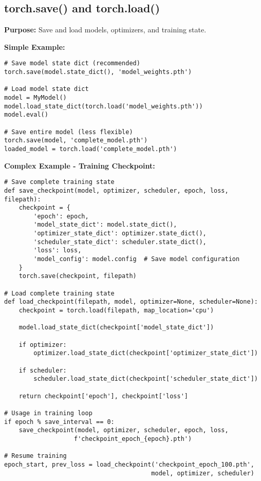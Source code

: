 \documentclass[11pt,a4paper]{book}
\begin{document}
\subsection{torch.save() and torch.load()}

\textbf{Purpose:} Save and load models, optimizers, and training state.

\textbf{Simple Example:}
\begin{verbatim}
# Save model state dict (recommended)
torch.save(model.state_dict(), 'model_weights.pth')

# Load model state dict
model = MyModel()
model.load_state_dict(torch.load('model_weights.pth'))
model.eval()

# Save entire model (less flexible)
torch.save(model, 'complete_model.pth')
loaded_model = torch.load('complete_model.pth')
\end{verbatim}

\textbf{Complex Example - Training Checkpoint:}
\begin{verbatim}
# Save complete training state
def save_checkpoint(model, optimizer, scheduler, epoch, loss, filepath):
    checkpoint = {
        'epoch': epoch,
        'model_state_dict': model.state_dict(),
        'optimizer_state_dict': optimizer.state_dict(),
        'scheduler_state_dict': scheduler.state_dict(),
        'loss': loss,
        'model_config': model.config  # Save model configuration
    }
    torch.save(checkpoint, filepath)

# Load complete training state
def load_checkpoint(filepath, model, optimizer=None, scheduler=None):
    checkpoint = torch.load(filepath, map_location='cpu')
    
    model.load_state_dict(checkpoint['model_state_dict'])
    
    if optimizer:
        optimizer.load_state_dict(checkpoint['optimizer_state_dict'])
    
    if scheduler:
        scheduler.load_state_dict(checkpoint['scheduler_state_dict'])
    
    return checkpoint['epoch'], checkpoint['loss']

# Usage in training loop
if epoch % save_interval == 0:
    save_checkpoint(model, optimizer, scheduler, epoch, loss, 
                   f'checkpoint_epoch_{epoch}.pth')

# Resume training
epoch_start, prev_loss = load_checkpoint('checkpoint_epoch_100.pth', 
                                        model, optimizer, scheduler)
\end{verbatim}
\end{document}
